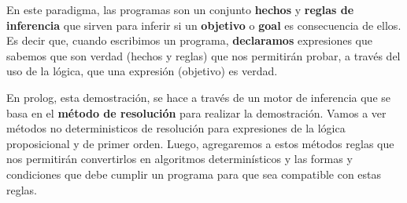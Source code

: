 En este paradigma, las programas son un conjunto \textbf{hechos} y \textbf{reglas de inferencia} que sirven para inferir si un \textbf{objetivo} o \textbf{goal} es consecuencia de ellos. Es decir que, cuando escribimos un programa, \textbf{declaramos} expresiones que sabemos que son verdad (hechos y reglas) que nos permitirán probar, a través del uso de la lógica, que una expresión (objetivo) es verdad.

En prolog, esta demostración, se hace a través de un motor de inferencia que se basa en el \textbf{método de resolución} para realizar la demostración. Vamos a ver métodos no deterministicos de resolución para expresiones de la lógica proposicional y de primer orden. Luego, agregaremos a estos métodos reglas que nos permitirán convertirlos en algoritmos determinísticos y las formas y condiciones que debe cumplir un programa para que sea compatible con estas reglas.
